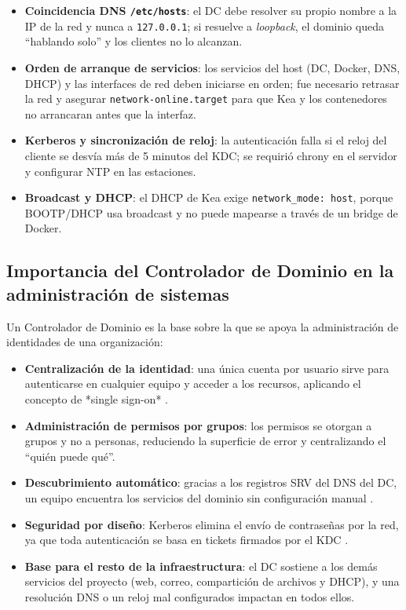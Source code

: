 \begin{itemize}
  \item \textbf{Coincidencia DNS \texttt{/etc/hosts}}: el DC debe resolver su
        propio nombre a la IP de la red y nunca a \texttt{127.0.0.1}; si
        resuelve a \textit{loopback}, el dominio queda ``hablando solo'' y los
        clientes no lo alcanzan.
  \item \textbf{Orden de arranque de servicios}: los servicios del host (DC,
        Docker, DNS, DHCP) y las interfaces de red deben iniciarse en orden;
        fue necesario retrasar la red y asegurar \texttt{network-online.target}
        para que Kea y los contenedores no arrancaran antes que la interfaz.
  \item \textbf{Kerberos y sincronización de reloj}: la autenticación falla si
        el reloj del cliente se desvía más de 5 minutos del KDC; se requirió
        chrony en el servidor y configurar NTP en las estaciones.
  \item \textbf{Broadcast y DHCP}: el DHCP de Kea exige
        \texttt{network\_mode: host}, porque BOOTP/DHCP usa broadcast y no
        puede mapearse a través de un bridge de Docker.
\end{itemize}

\subsection{Importancia del Controlador de Dominio en la administración de sistemas}

Un Controlador de Dominio es la base sobre la que se apoya la administración
de identidades de una organización:

\begin{itemize}
  \item \textbf{Centralización de la identidad}: una única cuenta por usuario
        sirve para autenticarse en cualquier equipo y acceder a los recursos,
        aplicando el concepto de *single sign-on* \citep{msft_activedirectory}.
  \item \textbf{Administración de permisos por grupos}: los permisos se
        otorgan a grupos y no a personas, reduciendo la superficie de error y
        centralizando el ``quién puede qué''.
  \item \textbf{Descubrimiento automático}: gracias a los registros SRV del
        DNS del DC, un equipo encuentra los servicios del dominio sin
        configuración manual \citep{rfc2782}.
  \item \textbf{Seguridad por diseño}: Kerberos elimina el envío de
        contraseñas por la red, ya que toda autenticación se basa en tickets
        firmados por el KDC \citep{rfc4120}.
  \item \textbf{Base para el resto de la infraestructura}: el DC sostiene a
        los demás servicios del proyecto (web, correo, compartición de
        archivos y DHCP), y una resolución DNS o un reloj mal configurados
        impactan en todos ellos.
\end{itemize}


